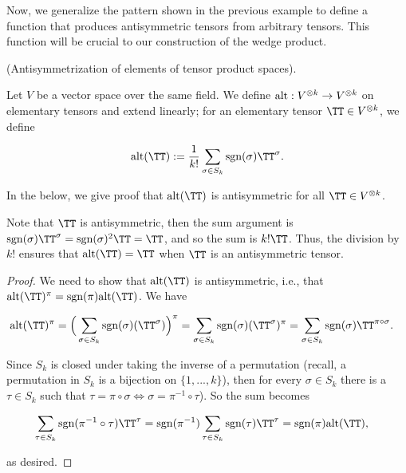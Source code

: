 Now, we generalize the pattern shown in the previous example to define a function that produces antisymmetric tensors from arbitrary tensors. This function will be crucial to our construction of the wedge product.

\begin{defn}
    (Antisymmetrization of elements of tensor product spaces).
    
    Let $V$ be a vector space over the same field. We define ${\text{alt}:V^{\otimes k} \rightarrow V^{\otimes k}}$ on elementary tensors and extend linearly; for an elementary tensor $\TT \in V^{\otimes k}$, we define
    
    \begin{align*}
        \alt(\TT) := \frac{1}{k!} \sum_{\sigma \in S_k} \sgn(\sigma) \TT^\sigma.
    \end{align*}

    In the below, we give proof that $\alt(\TT)$ is antisymmetric for all $\TT \in V^{\otimes k}$.
    
    Note that $\TT$ is antisymmetric, then the sum argument is $\sgn(\sigma) \TT^\sigma = \sgn(\sigma)^2 \TT = \TT$, and so the sum is $k! \TT$. Thus, the division by $k!$ ensures that $\alt(\TT) = \TT$ when $\TT$ is an antisymmetric tensor.
\end{defn}

\begin{proof}
    We need to show that $\alt(\TT)$ is antisymmetric, i.e., that $\alt(\TT)^\pi = \sgn(\pi) \alt(\TT)$. We have
            
    \begin{align*}
        \alt(\TT)^\pi &= \Big(\sum_{\sigma \in S_k} \sgn(\sigma) (\TT^\sigma)\Big)^\pi = \sum_{\sigma \in S_k} \sgn(\sigma) (\TT^\sigma)^\pi = \sum_{\sigma \in S_k} \sgn(\sigma) \TT^{\pi \circ \sigma}.
    \end{align*}
            
    Since $S_k$ is closed under taking the inverse of a permutation (recall, a permutation in $S_k$ is a bijection on $\{1, ..., k\}$), then for every $\sigma \in S_k$ there is a $\tau \in S_k$ such that $\tau = \pi \circ \sigma \iff \sigma = \pi^{-1} \circ \tau$). So the sum becomes
            
    \begin{align*}
        \sum_{\tau \in S_k} \sgn(\pi^{-1} \circ \tau) \TT^\tau &= \sgn(\pi^{-1}) \sum_{\tau \in S_k} \sgn(\tau) \TT^\tau = \sgn(\pi) \alt(\TT),
    \end{align*}

    as desired.
\end{proof}

